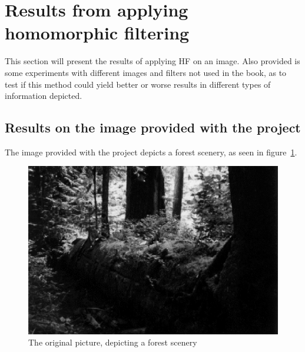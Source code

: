 \section{Results from applying homomorphic filtering}
	This section will present the results of applying HF
	on an image. Also provided is some experiments with different images
	and filters not used in the book, as to test if this method could yield
	better or worse results in different types of information depicted.
	\subsection{Results on the image provided with the project}
		The image provided with the project depicts a forest scenery, %
		as seen in figure~\ref{fig:original}.
		\begin{figure}[h!]
			\centering
			\includegraphics[width=0.6\linewidth]{pics/orig_pic.png}
			\caption{The original picture, depicting a forest scenery}
			\label{fig:original}		
		\end{figure}		
		
